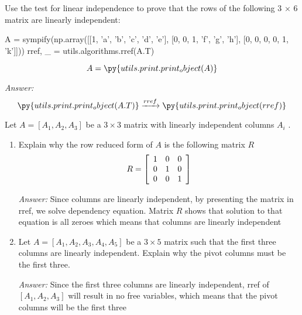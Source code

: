 \documentclass[letterpaper]{article}
\newcommand{\ans}{\textit{Answer: }}
\newenvironment{question}[2][Question]{\begin{trivlist}
\item[\hskip \labelsep {\bfseries #1}\hskip \labelsep {\bfseries #2.}]}{\end{trivlist}}
\newcommand{\printobj}[1]{\py{utils.print.print_object(#1)}}
\begin{document}
\begin{question}{2.7}
    Use the test for linear independence to prove that the rows of the following
    3 × 6 matrix are linearly independent:

    \begin{pycode}
A = sympify(np.array([[1, 'a', 'b', 'c', 'd', 'e'], [0, 0, 1, 'f', 'g', 'h'], [0, 0, 0, 0, 1, 'k']]))
rref, _ = utils.algorithms.rref(A.T)
    \end{pycode}

    $$A = \printobj{A}$$

    \ans 
    $$\printobj{A.T} \xrightarrow{rref} \printobj{rref}$$
\end{question}

\begin{question}{2.8}
    Let $A = \left[ A _ { 1 } , A _ { 2 } , A _ { 3 } \right]$ be a $3 \times 3$
    matrix with linearly independent columns $A _ { i }$ .

    \begin{enumerate}[label=\textbf{(\alph*)}]
        \item Explain why the row reduced form of $A$ is the following matrix $R$
        $$
        R = \left[ \begin{array} { l l l } { 1 } & { 0 } & { 0 } \\ { 0 } & { 1 } & { 0 } \\ { 0 } & { 0 } & { 1 } \end{array} \right]
        $$

        \ans Since columns are linearly independent, by presenting the matrix 
        in rref, we solve dependency equation. Matrix $R$ shows that solution 
        to that equation is all zeroes which means that columns are linearly 
        independent

        \item Let $A = \left[ A _ { 1 } , A _ { 2 } , A _ { 3 } , A _ { 4 } , A _ { 5 } \right]$
        be a $3 \times 5$ matrix such that the first three
        columns are linearly independent. Explain why the pivot columns must
        be the first three. 

        \ans Since the first three columns are linearly independent,
        rref of $\left[ A _ { 1 } , A _ { 2 } , A _ { 3 }\right]$ will result
        in no free variables, which means that the pivot columns will
        be the first three
    \end{enumerate}

\end{question}
 
\end{document}
